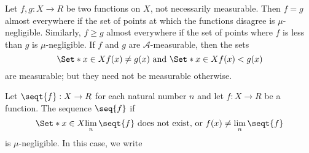 
Let $f, g: X \to R$
be two functions on $X$,
not necessarily measurable.
Then $f = g$ almost everywhere
if the set of points at which the
functions disagree is
$\mu$-negligible.
Similarly, $f \geq g$ almost
everywhere if the set of points
where $f$ is less than $g$
is $\mu$-negligible.
If $f$ and $g$ are
$\mathcal{A}$-measurable, then
the sets
\[
\Set*{x \in X}{f(x) \neq g(x)}
\text{ and }
\Set*{x \in X}{f(x) < g(x)}
\]
are measurable; but they need
not be measurable otherwise.

Let $\seqt{f}: X \to R$ for each natural
number $n$
and let
$f: X \to R$
be a function.
The sequence $\seq{f}$
if
\[
  \Set*{x \in X}{\lim_{n} \seqt{f} \text{ does not exist, or } f(x) \neq \lim_{n} \seqt{f}}
\]
is $\mu$-negligible.
In this case, we write

\strats
\strats
